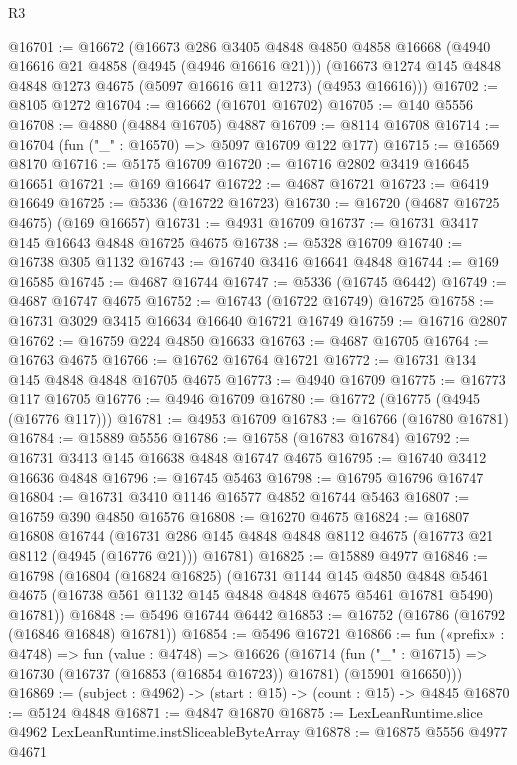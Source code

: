 \begin{lexlean}{R3}
\begin{coremodule}
@16701 := @16672
    (@16673
      @286
      @3405
      @4848
      @4850
      @4858
      @16668
      (@4940 @16616 @21 @4858 (@4945 (@4946 @16616 @21)))
      (@16673 @1274 @145 @4848 @4848 @1273 @4675 (@5097 @16616 @11 @1273) (@4953 @16616)))
@16702 := @8105 @1272
@16704 := @16662 (@16701 @16702)
@16705 := @140 @5556
@16708 := @4880 (@4884 @16705) @4887
@16709 := @8114 @16708
@16714 := @16704 (fun ("_" : @16570) => @5097 @16709 @122 @177)
@16715 := @16569 @8170
@16716 := @5175 @16709
@16720 := @16716 @2802 @3419 @16645 @16651
@16721 := @169 @16647
@16722 := @4687 @16721
@16723 := @6419 @16649
@16725 := @5336 (@16722 @16723)
@16730 := @16720 (@4687 @16725 @4675) (@169 @16657)
@16731 := @4931 @16709
@16737 := @16731 @3417 @145 @16643 @4848 @16725 @4675
@16738 := @5328 @16709
@16740 := @16738 @305 @1132
@16743 := @16740 @3416 @16641 @4848
@16744 := @169 @16585
@16745 := @4687 @16744
@16747 := @5336 (@16745 @6442)
@16749 := @4687 @16747 @4675
@16752 := @16743 (@16722 @16749) @16725
@16758 := @16731 @3029 @3415 @16634 @16640 @16721 @16749
@16759 := @16716 @2807
@16762 := @16759 @224 @4850 @16633
@16763 := @4687 @16705
@16764 := @16763 @4675
@16766 := @16762 @16764 @16721
@16772 := @16731 @134 @145 @4848 @4848 @16705 @4675
@16773 := @4940 @16709
@16775 := @16773 @117 @16705
@16776 := @4946 @16709
@16780 := @16772 (@16775 (@4945 (@16776 @117)))
@16781 := @4953 @16709
@16783 := @16766 (@16780 @16781)
@16784 := @15889 @5556
@16786 := @16758 (@16783 @16784)
@16792 := @16731 @3413 @145 @16638 @4848 @16747 @4675
@16795 := @16740 @3412 @16636 @4848
@16796 := @16745 @5463
@16798 := @16795 @16796 @16747
@16804 := @16731 @3410 @1146 @16577 @4852 @16744 @5463
@16807 := @16759 @390 @4850 @16576
@16808 := @16270 @4675
@16824 := @16807
    @16808
    @16744
    (@16731 @286 @145 @4848 @4848 @8112 @4675 (@16773 @21 @8112 (@4945 (@16776 @21))) @16781)
@16825 := @15889 @4977
@16846 := @16798
    (@16804
      (@16824 @16825)
      (@16731
        @1144
        @145
        @4850
        @4848
        @5461
        @4675
        (@16738 @561 @1132 @145 @4848 @4848 @4675 @5461 @16781 @5490)
        @16781))
@16848 := @5496 @16744 @6442
@16853 := @16752 (@16786 (@16792 (@16846 @16848) @16781))
@16854 := @5496 @16721
@16866 := fun («prefix» : @4748) =>
  fun (value : @4748) =>
  @16626
    (@16714 (fun ("_" : @16715) => @16730 (@16737 (@16853 (@16854 @16723)) @16781) (@15901 @16650)))
@16869 := (subject : @4962) -> (start : @15) -> (count : @15) -> @4845
@16870 := @5124 @4848
@16871 := @4847 @16870
@16875 := LexLeanRuntime.slice @4962 LexLeanRuntime.instSliceableByteArray
@16878 := @16875 @5556 @4977 @4671

\end{coremodule}
\end{lexlean}
